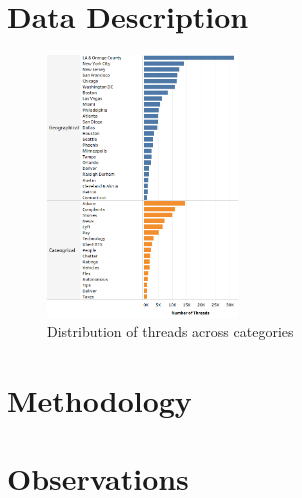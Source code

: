 \documentclass[10pt, twocolumn]{article}
\begin{document}
\section{Data Description}

\begin{figure}[b]
    \centering
    \includegraphics[width=0.45\textwidth]{img/Threads by Forum.png}
    \caption{Distribution of threads across categories}
    \label{fig:threads-by-forum}
\end{figure}

\section{Methodology}

\section{Observations}
\end{document}
